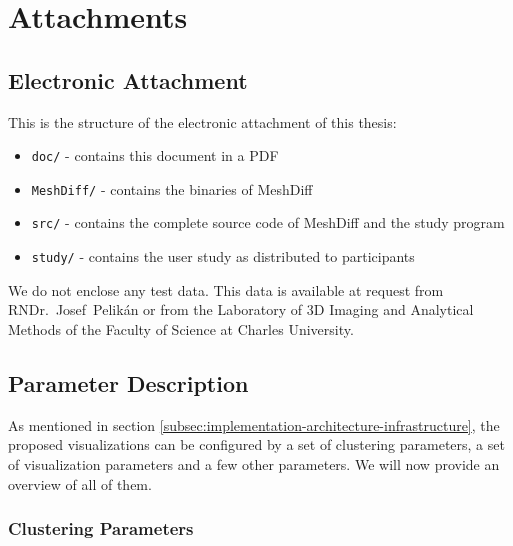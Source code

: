 \chapter{Attachments}

\section{Electronic Attachment}
\label{attch:electronic}

This is the structure of the electronic attachment of this thesis:

\begin{itemize}
	\item \verb+doc/+ - contains this document in a PDF
	\item \verb+MeshDiff/+ - contains the binaries of MeshDiff
	\item \verb+src/+ - contains the complete source code of MeshDiff and the study program
	\item \verb+study/+ - contains the user study as distributed to participants
\end{itemize}

We do not enclose any test data. This data is available at request from RNDr.~Josef~Pelikán or from the Laboratory of 3D Imaging and Analytical Methods of the Faculty of Science at Charles University.

\clearpage

\section{Parameter Description}
\label{attch:parameter_description}

As mentioned in section \ref{subsec:implementation-architecture-infrastructure}, the proposed visualizations can be configured by a set of clustering parameters, a set of visualization parameters and a few other parameters. We will now provide an overview of all of them.

\subsection{Clustering Parameters}
\label{attch:parameter_desc-clustering_parameters}


